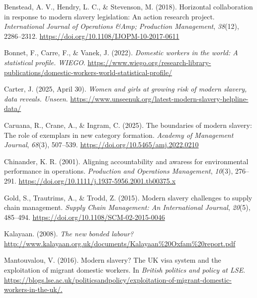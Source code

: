 \documentclass[
  12pt,
]{article}
\newlength{\cslhangindent}
\newenvironment{CSLReferences}[2] %
 {\begin{list}{}{%
  \setlength{\itemindent}{0pt}
  \setlength{\leftmargin}{0pt}
  \setlength{\parsep}{0pt}
  \ifodd #1
   \setlength{\leftmargin}{\cslhangindent}
   \setlength{\itemindent}{-1\cslhangindent}
  \fi
  \setlength{\itemsep}{#2\baselineskip}}}
 {\end{list}}
\theoremstyle{plain}
\theoremstyle{definition}
\begin{document}
\label{refs}
\begin{CSLReferences}{1}{0}
Benstead, A. V., Hendry, L. C., \& Stevenson, M. (2018). Horizontal
collaboration in response to modern slavery legislation: An action
research project. \emph{International Journal of Operations \&Amp;
Production Management}, \emph{38}(12), 2286--2312.
\url{https://doi.org/10.1108/IJOPM-10-2017-0611}

Bonnet, F., Carre, F., \& Vanek, J. (2022). \emph{Domestic workers in
the world: A statistical profile. {WIEGO}}.
\url{https://www.wiego.org/research-library-publications/domestic-workers-world-statistical-profile/}

Carter, J. (2025, April 30). \emph{Women and girls at growing risk of
modern slavery, data reveals. Unseen}.
\url{https://www.unseenuk.org/latest-modern-slavery-helpline-data/}

Caruana, R., Crane, A., \& Ingram, C. (2025). The boundaries of modern
slavery: The role of exemplars in new category formation. \emph{Academy
of Management Journal}, \emph{68}(3), 507--539.
\url{https://doi.org/10.5465/amj.2022.0210}

Chinander, K. R. (2001). Aligning accountability and awaress for
environmental performance in operations. \emph{Production and Operations
Management}, \emph{10}(3), 276--291.
\url{https://doi.org/10.1111/j.1937-5956.2001.tb00375.x}

Gold, S., Trautrims, A., \& Trodd, Z. (2015). Modern slavery challenges
to supply chain management. \emph{Supply Chain Management: An
International Journal}, \emph{20}(5), 485--494.
\url{https://doi.org/10.1108/SCM-02-2015-0046}

Kalayaan. (2008). \emph{The new bonded labour?}
\url{http://www.kalayaan.org.uk/documents/Kalayaan\%20Oxfam\%20report.pdf}

Mantouvalou, V. (2016). Modern slavery? The {UK} visa system and the
exploitation of migrant domestic workers. In \emph{British politics and
policy at {LSE}}.
\url{https://blogs.lse.ac.uk/politicsandpolicy/exploitation-of-migrant-domestic-workers-in-the-uk/.}


\end{CSLReferences}
\end{document}
